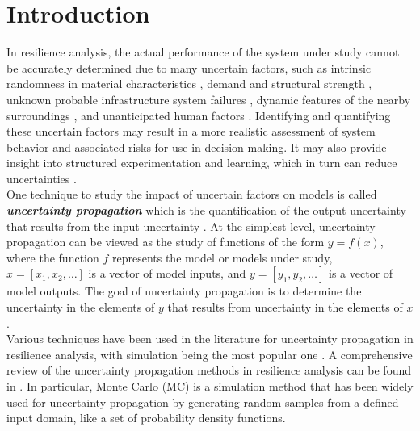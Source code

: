 \section{Introduction}
    \label{sec:intro}    
    In resilience analysis, the actual performance of the system under study cannot be accurately determined due to many uncertain factors, such as intrinsic randomness in material characteristics \cite{padgett_sensitivity_2007}, demand and structural strength \cite{gardoni_life-cycle_2017}, unknown probable infrastructure system failures \cite{woods_managing_2003}, dynamic features of the nearby surroundings \cite{archibald_infrastructure_2013}, and unanticipated human factors \cite{wilson_rail_2005}. Identifying and quantifying these uncertain factors may result in a more realistic assessment of system behavior and associated risks for use in decision-making. It may also provide insight into structured experimentation and learning, which in turn can reduce uncertainties \cite{allen_adaptive_2011}. \\
    One technique to study the impact of uncertain factors on models is called \textbf{\textit{uncertainty propagation}} which is the quantification of the output uncertainty that results from the input uncertainty \cite{morgan_uncertainty_1992}. At the simplest level, uncertainty propagation can be viewed as the study of functions of the form $y=f(x)$, where the function $f$ represents the model or models under study, $x=[x_1,x_2,…]$ is a vector of model inputs, and $y=[y_1,y_2,…]$ is a vector of model outputs. The goal of uncertainty propagation is to determine the uncertainty in the elements of $y$ that results from uncertainty in the elements of $x$.\\
    Various techniques have been used in the literature for uncertainty propagation in resilience analysis, with simulation being the most popular one \cite{sun_resilience_2020}. A comprehensive review of the uncertainty propagation methods in resilience analysis can be found in \cite{sun_resilience_2020}. In particular, Monte Carlo (MC) is a simulation method that has been widely used \cite{zheng_bayesian-based_2022, cicilio_electrical_2020, tabandeh_uncertainty_2022, younesi_assessing_2020} for uncertainty propagation by generating random samples from a defined input domain, like a set of probability density functions. \\ 
